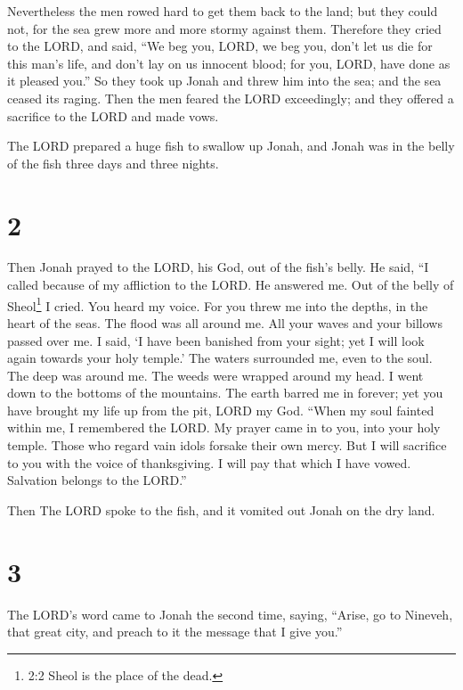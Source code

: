  Nevertheless the men rowed hard to get them back to the
land; but they could not, for the sea grew more and more stormy against
them.  Therefore they cried to the LORD, and said, ``We beg
you, LORD, we beg you, don't let us die for this man's life, and don't
lay on us innocent blood; for you, LORD, have done as it pleased you.''
 So they took up Jonah and threw him into the sea; and the
sea ceased its raging.  Then the men feared the LORD
exceedingly; and they offered a sacrifice to the LORD and made vows.

 The LORD prepared a huge fish to swallow up Jonah, and
Jonah was in the belly of the fish three days and three nights.

\hypertarget{section-1}{%
\section{2}\label{section-1}}

 Then Jonah prayed to the LORD, his God, out of the fish's
belly.  He said, ``I called because of my affliction to the
LORD. He answered me. Out of the belly of Sheol\footnote{2:2 Sheol is
  the place of the dead.} I cried. You heard my voice.  For
you threw me into the depths, in the heart of the seas. The flood was
all around me. All your waves and your billows passed over me.
 I said, `I have been banished from your sight; yet I will
look again towards your holy temple.'  The waters surrounded
me, even to the soul. The deep was around me. The weeds were wrapped
around my head.  I went down to the bottoms of the
mountains. The earth barred me in forever; yet you have brought my life
up from the pit, LORD my God.  ``When my soul fainted within
me, I remembered the LORD. My prayer came in to you, into your holy
temple.  Those who regard vain idols forsake their own
mercy.  But I will sacrifice to you with the voice of
thanksgiving. I will pay that which I have vowed. Salvation belongs to
the LORD.''

 Then The LORD spoke to the fish, and it vomited out Jonah
on the dry land.

\hypertarget{section-2}{%
\section{3}\label{section-2}}

 The LORD's word came to Jonah the second time, saying,
 ``Arise, go to Nineveh, that great city, and preach to it
the message that I give you.''

